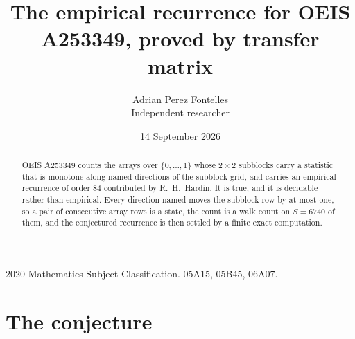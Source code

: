 \documentclass[11pt,a4paper]{article}
\title{The empirical recurrence for OEIS A253349, proved by transfer matrix}
\author{Adrian Perez Fontelles\\ \small Independent researcher}
\date{14 September 2026}
\theoremstyle{plain}
\theoremstyle{definition}
\begin{document}
\maketitle

\begin{abstract}
OEIS A253349 counts the arrays over $\{0,\dots,1\}$ whose $2\times2$ subblocks carry a
statistic that is monotone along named directions of the subblock grid, and carries an
empirical recurrence of order $84$ contributed by R.~H.~Hardin. It is true, and it is
decidable rather than empirical. Every direction named moves the subblock row by at most one,
so a pair of consecutive array rows is a state, the count is a walk count on $S=6740$ of them,
and the conjectured recurrence is then settled by a finite exact computation.
\end{abstract}

\noindent\small 2020 Mathematics Subject Classification. 05A15, 05B45, 06A07.\normalsize

\section{The conjecture}
\end{document}
